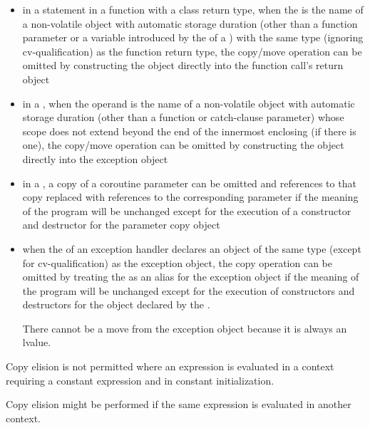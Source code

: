 \begin{itemize}
\item in a  statement in a function with a class return type,
when the  is the name of a non-volatile
object with automatic storage duration (other than a function parameter or a variable
introduced by the  of a
)
with the same type (ignoring cv-qualification) as
the function return type, the copy/move operation can be
omitted by constructing the object directly
into the function call's return object

\item in a , when the operand
is the name of a non-volatile object with automatic storage duration
(other than a function or catch-clause parameter)
whose scope does not extend beyond the end of the innermost enclosing
 (if there is one),
the copy/move operation can be omitted by
constructing the object directly into the exception object

\item in a , a copy of a coroutine parameter
can be omitted and references to that copy replaced with references to the
corresponding parameter if the meaning of the program will be unchanged except for
the execution of a constructor and destructor for the parameter copy object

\item when the  of an
exception handler declares an object of the same
type (except for cv-qualification) as the exception
object, the copy operation can be omitted by treating
the  as an alias for the exception
object if the meaning of the program will be unchanged except for the execution
of constructors and destructors for the object declared by the
.
\begin{note}
There cannot be a move from the exception object because it is
always an lvalue.
\end{note}
\end{itemize}
Copy elision is not permitted
where an expression is evaluated in a context
requiring a constant expression
and in constant initialization.
\begin{note}
Copy elision might be performed
if the same expression
is evaluated in another context.
\end{note}

